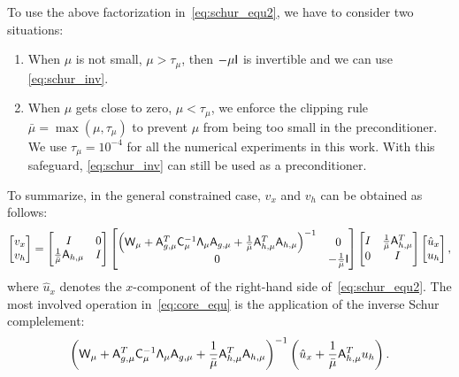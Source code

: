 To use the above factorization in~\eqref{eq:schur_equ2}, we have to consider two situations: 
\begin{enumerate}
\item When $\mu$ is not small, \eg $\mu > \tau_{\mu}$, then $- \mu \mathsf{I}$ is invertible and we can use \eqref{eq:schur_inv}.   %
\item When $\mu$ gets close to zero, \eg $\mu < \tau_{\mu}$, we enforce the clipping rule 
$ \bar{\mu} = \max(\mu, \tau_\mu) $ 
to prevent $\mu$ from being too small in the preconditioner. We use $\tau_{\mu} = 10^{-4}$ for all the numerical experiments in this work. With this safeguard,  \eqref{eq:schur_inv} can still be used as a preconditioner.
\end{enumerate}
To summarize, in the general constrained case, $v_x$ and $v_h$ can be obtained as follows:
\begin{equation}\label{eq:core_equ}
\begin{bmatrix} v_x \\ v_h  \end{bmatrix} 
=
\begin{bmatrix}
I & 0 \\
\frac{1}{\bar{\mu}} \mathsf{A}_{h,\mu}  &  I 
\end{bmatrix}
\begin{bmatrix}
\left(\mathsf{W}_\mu +  \mathsf{A}_{g,\mu}^T  \mathsf{C}_\mu^{-1} \mathsf{\Lambda}_\mu  \mathsf{A}_{g,\mu}  
+ \frac{1}{\bar{\mu}}  \mathsf{A}_{h,\mu}^T \mathsf{A}_{h,\mu} \right)^{-1}    & 0 \\
0  &  -\frac{1}{\bar{\mu}}\mathsf{I} 
\end{bmatrix}
\begin{bmatrix}
I  & \frac{1}{\bar{\mu}} \mathsf{A}_{h,\mu}^T  \\
0  &  I
\end{bmatrix}
\begin{bmatrix}
\hat{u}_{x} \\ u_h
\end{bmatrix},
\end{equation}
where $\hat{u}_x$ denotes the $x$-component of the right-hand side of~\eqref{eq:schur_equ2}.  The most involved operation in~\eqref{eq:core_equ} is the application of the inverse Schur complelement:
\begin{equation}
\left(\mathsf{W}_\mu +  \mathsf{A}_{g,\mu}^T  \mathsf{C}_\mu^{-1} \mathsf{\Lambda}_\mu  \mathsf{A}_{g,\mu}  
+ \frac{1}{\bar{\mu}}  \mathsf{A}_{h,\mu}^T \mathsf{A}_{h,\mu} \right)^{-1}  \left(\hat{u}_{x} + \frac{1}{\bar{\mu}} \mathsf{A}_{h,\mu}^T u_{h}  \right). 
\end{equation}

